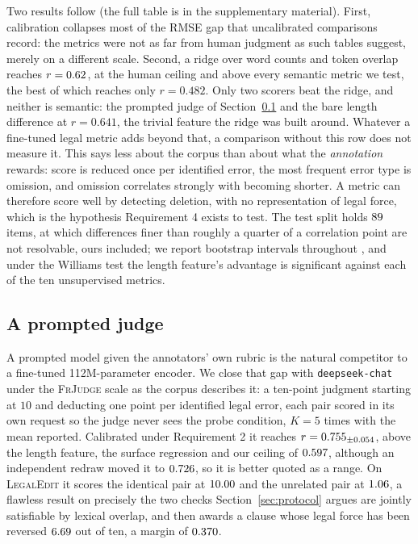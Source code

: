 \documentclass[11pt]{article}
\begin{document}
Two results follow (the full table is in the supplementary material). First,
calibration collapses most of the RMSE gap that uncalibrated comparisons record:
the metrics were not as far from human judgment as such tables suggest, merely
on a different scale. Second, a ridge over word counts and token overlap reaches
$r=0.62$, at the human ceiling and above every semantic metric we test, the
best of which reaches only $r=0.482$. Only two scorers beat the ridge, and
neither is semantic: the prompted judge of
Section~\ref{sec:judge} and the bare length difference at $r=0.641$, the trivial
feature the ridge was built around. Whatever a fine-tuned legal metric adds beyond that, a comparison
without this row does not measure it. This says less about the corpus than about what the
\emph{annotation} rewards: score is reduced once per
identified error, the most frequent error type is omission, and omission
correlates strongly with becoming shorter. A metric can therefore score well by
detecting deletion, with no representation of legal force, which is the
hypothesis Requirement 4 exists to test. The test split holds $89$ items, at which differences finer than
roughly a quarter of a correlation point are not resolvable, ours included; we
report bootstrap intervals throughout \citep{deutsch2021statistical}, and under
the Williams test the length feature's advantage is significant against each of
the ten unsupervised metrics.

\subsection{A prompted judge}
\label{sec:judge}

A prompted model given the annotators' own rubric \citep{enguehard2025lemaj} is
the natural competitor to a fine-tuned 112M-parameter encoder. We close that gap
with \texttt{deepseek-chat} under the \textsc{FrJudge} scale as the corpus
describes
it: a ten-point judgment starting at $10$ and deducting one point per identified
legal error, each pair scored in its own request so the judge never sees the
probe condition, $K=5$ times with the mean reported. Calibrated under
Requirement 2 it reaches $r=0.755_{\pm0.054}$, above the length feature,
the surface regression and our ceiling of $0.597$,
although an independent redraw moved it to $0.726$, so it is better quoted
as a range. On \textsc{LegalEdit} it scores the identical pair at $10.00$
and the unrelated pair at $1.06$, a flawless result on precisely the two
checks Section~\ref{sec:protocol} argues are jointly satisfiable by lexical
overlap, and then awards a clause whose legal force has been reversed
$6.69$ out of ten, a margin of $0.370$.
\end{document}
